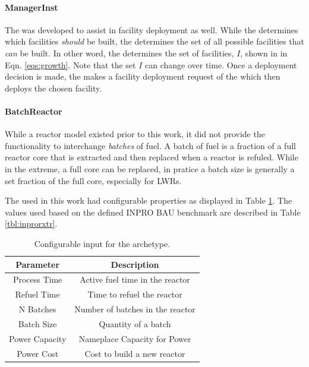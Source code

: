 \paragraph{ManagerInst}

The  was developed to assist in facility deployment as
well. While the  determines which facilities \textit{should}
be built, the  determines the set of all possible facilities
that \textit{can} be built. In other word, the  determines the
set of facilities, $I$, shown in in Eqn. \ref{eqs:growth}. Note that the set $I$
can change over time. Once a deployment decision is made, the
 makes a facility deployment request of the
 which then deploys the chosen facility.

\paragraph{BatchReactor}

While a reactor model existed prior to this work, it did not provide the
functionality to interchange \textit{batches} of fuel. A batch of fuel is a
fraction of a full reactor core that is extracted and then replaced when a
reactor is refuled. While in the extreme, a full core can be replaced, in
pratice a batch size is generally a set fraction of the full core, especially
for LWRs.

The  used in this work had configurable properties as
displayed in Table \ref{tbl:batchrxtr}. The values used based on the defined
INPRO BAU benchmark are described in Table \ref{tbl:inprorxtr}.

\begin{table}[h]
\centering
\begin{tabular}{cc}
Parameter      & Description                     \\ \hline
Process Time   & Active fuel time in the reactor                        \\
Refuel Time    & Time to refuel the reactor                              \\
N Batches      & Number of batches in the reactor                         \\
Batch Size     & Quantity of a batch                                 \\
Power Capacity & Nameplace Capacity for Power                          \\
Power Cost     & Cost to build a new reactor      \\ \hline
\end{tabular}
\caption{Configurable input for the  archetype.}
\label{tbl:batchrxtr}
\end{table}

